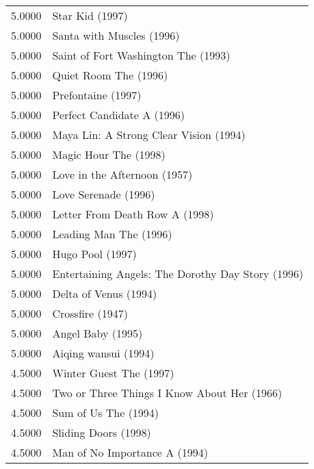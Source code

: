\begin{flushleft}
\begin{table}[h]
\centering
\begin{tabular}{ll}
5.0000 & Star Kid (1997)                                         \\
5.0000 & Santa with Muscles (1996)                               \\
5.0000 & Saint of Fort Washington The (1993)                     \\
5.0000 & Quiet Room The (1996)                                   \\
5.0000 & Prefontaine (1997)                                      \\
5.0000 & Perfect Candidate A (1996)                              \\
5.0000 & Maya Lin: A Strong Clear Vision (1994)                  \\
5.0000 & Magic Hour The (1998)                                   \\
5.0000 & Love in the Afternoon (1957)                            \\
5.0000 & Love Serenade (1996)                                    \\
5.0000 & Letter From Death Row A (1998)                          \\
5.0000 & Leading Man The (1996)                                  \\
5.0000 & Hugo Pool (1997)                                        \\
5.0000 & Entertaining Angels: The Dorothy Day Story (1996)       \\
5.0000 & Delta of Venus (1994)                                   \\
5.0000 & Crossfire (1947)                                        \\
5.0000 & Angel Baby (1995)                                       \\
5.0000 & Aiqing wansui (1994)                                    \\ \hline
4.5000 & Winter Guest The (1997)                                 \\
4.5000 & Two or Three Things I Know About Her (1966)             \\
4.5000 & Sum of Us The (1994)                                    \\
4.5000 & Sliding Doors (1998)                                    \\
4.5000 & Man of No Importance A (1994)                           \\

\end{tabular}
\end{table}
\end{flushleft}
